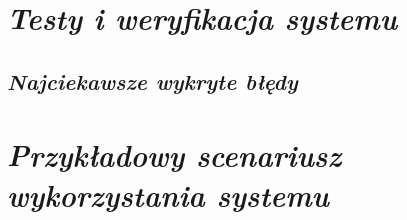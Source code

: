 \documentclass[a4paper,10pt, twoside]{report}
\newcommand{\customstylechapter}[1]{\large{\textit{#1}}}
\newcommand{\customstylesection}[1]{\textbf{\textit{#1}}}
\begin{document}
\begin{large}
\chapter{\customstylechapter{Testy i weryfikacja systemu}}
{}

\section{\customstylesection{Najciekawsze wykryte błędy}}
{}

\chapter{\customstylechapter{Przykładowy scenariusz wykorzystania systemu}}
{}


\end{large}
\end{document}
